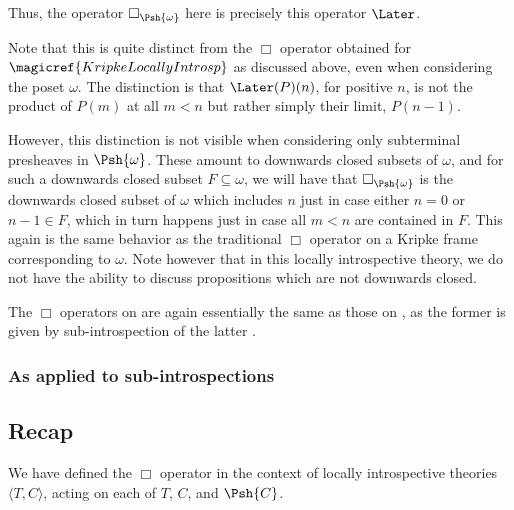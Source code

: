 Thus, the operator $\Box_{\Psh{\omega}}$ here is precisely this operator $\Later$.

Note that this is quite distinct from the $\Box$ operator obtained for $\magicref{KripkeLocallyIntrosp}$ as discussed above, even when considering the poset $\omega$. The distinction is that $\Later(P)(n)$, for positive $n$, is not the product of $P(m)$ at all $m < n$ but rather simply their limit, $P(n - 1)$.

However, this distinction is not visible when considering only subterminal presheaves in $\Psh{\omega}$. These amount to downwards closed subsets of $\omega$, and for such a downwards closed subset $F \subseteq \omega$, we will have that $\Box_{\Psh{\omega}}$ is the downwards closed subset of $\omega$ which includes $n$ just in case either $n = 0$ or $n - 1 \in F$, which in turn happens just in case all $m < n$ are contained in $F$. This again is the same behavior as the traditional $\Box$ operator on a Kripke frame corresponding to $\omega$. Note however that in this locally introspective theory, we do not have the ability to discuss propositions which are not downwards closed.

The $\Box$ operators on  are again essentially the same as those on , as the former is given by sub-introspection of the latter .

\subsubsection{As applied to sub-introspections}

\subsection{Recap}
We have defined the $\Box$ operator in the context of locally introspective theories $\langle T, C \rangle$, acting on each of $T$, $C$, and $\Psh{C}$.

